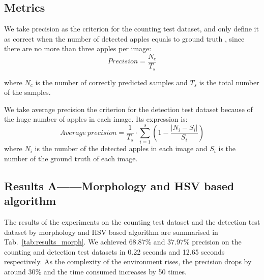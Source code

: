 \subsection{Metrics}
We take precision as the criterion for the counting test dataset, and only define it as correct when the number of detected apples equals to ground truth , since there are no more than three apples per image:
\begin{equation}
    Precision = \frac{N_c}{T_s} 
\end{equation}

where $N_c$ is the number of correctly predicted samples and $T_s$ is the total number of the samples.

We take average precision the criterion for the detection test dataset because of the huge number of apples in each image. Its expression is:
\begin{equation}
    Average\ precision = \frac{1}{T_s}\cdot \sum_{i=1}^{s}(1 - \frac{|N_i-S_i|}{S_i} )
\end{equation}
where $N_i$ is the number of the detected apples in each image and $S_i$ is the number of the ground truth of each image.

\subsection{Results A——Morphology and HSV based algorithm}
The results of the experiments on the counting test dataset and the detection test dataset by morphology and HSV based algorithm are summarised in Tab.~\ref{tab:results_morph}. We achieved 68.87\% and 37.97\% precision on the counting and detection test datasets in 0.22 seconds and 12.65 seconds respectively. As the complexity of the environment rises, the precision drops by around 30\% and the time consumed increases by 50 times.

\begin{table}[htb]
\centering
\caption{Results of morphology and HSV based algorithm}
\label{tab:results_morph}
\end{table}

